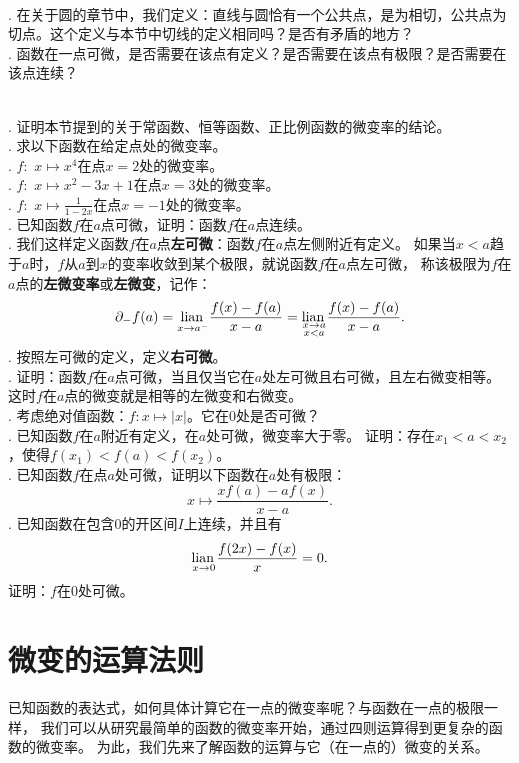 \documentclass[12pt,UTF8,fontset=none]{ctexbook}
\begin{document}
\begin{sk}
    \mbox{} \\
    . 在关于圆的章节中，我们定义：直线与圆恰有一个公共点，是为相切，公共点为切点。这个定义与本节中切线的定义相同吗？是否有矛盾的地方？\\
    . 函数在一点可微，是否需要在该点有定义？是否需要在该点有极限？是否需要在该点连续？
\end{sk}

\begin{xt}
    \mbox{} \\
    . 证明本节提到的关于常函数、恒等函数、正比例函数的微变率的结论。\\
    . 求以下函数在给定点处的微变率。\\
    . $f: \,\, x \mapsto x^4$在点$x = 2$处的微变率。\\
    . $f: \,\, x \mapsto x^2 - 3x + 1$在点$x = 3$处的微变率。\\
    . $f: \,\, x \mapsto \frac{1}{1 - 2x}$在点$x = -1$处的微变率。\\
    . 已知函数$f$在$a$点可微，证明：函数$f$在$a$点连续。\\
    . 我们这样定义函数$f$在$a$点\textbf{左可微}：函数$f$在$a$点左侧附近有定义。
    如果当$x<a$趋于$a$时，$f$从$a$到$x$的变率收敛到某个极限，就说函数$f$在$a$点左可微，
    称该极限为$f$在$a$点的\textbf{左微变率}或\textbf{左微变}，记作：
    $$ \partial_- f(a) = \underset{x\to a^-}{\operatorname{lian}\,} \frac{f(x) - f(a)}{x - a} = \underset{\substack{x\to a \\ x < a}}{\operatorname{lian}\,} \frac{f(x) - f(a)}{x - a}. $$
    . 按照左可微的定义，定义\textbf{右可微}。\\
    . 证明：函数$f$在$a$点可微，当且仅当它在$a$处左可微且右可微，且左右微变相等。
    这时$f$在$a$点的微变就是相等的左微变和右微变。\\
    . 考虑绝对值函数：$f:x\mapsto |x|$。它在$0$处是否可微？\\
    . 已知函数$f$在$a$附近有定义，在$a$处可微，微变率大于零。
    证明：存在$x_1 < a < x_2$，使得$f(x_1) < f(a) < f(x_2)$。\\
    . 已知函数$f$在点$a$处可微，证明以下函数在$a$处有极限：
    $$ x \mapsto \frac{xf(a) - af(x)}{x - a}.$$
    . 已知函数在包含$0$的开区间$I$上连续，并且有
    $$ \underset{x\to 0}{\operatorname{lian}\,} \frac{f(2x) - f(x)}{x} = 0.$$
    \indent 证明：$f$在$0$处可微。
\end{xt}

\section{微变的运算法则}
已知函数的表达式，如何具体计算它在一点的微变率呢？与函数在一点的极限一样，
我们可以从研究最简单的函数的微变率开始，通过四则运算得到更复杂的函数的微变率。
为此，我们先来了解函数的运算与它（在一点的）微变的关系。
\end{document}
